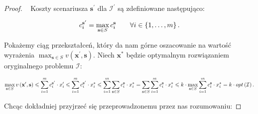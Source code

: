 \begin{proof}~\cite[$430$]{minmaxSurvey}
	Koszty scenariusza $\textbf{s}^{\prime}$ dla $\mathcal{I}^{\prime}$ są zdefiniowane następująco:
	
	\begin{equation}
		c^{\textbf{s}^{\prime}}_{i} = \max_{\mathclap{\textbf{s} \in S}} c^{\textbf{s}}_{i} \qquad \forall i \in \left\{ 1, \dots, m \right\}\text{.}
	\end{equation}
	
	Pokażemy ciąg przekształceń, który da nam górne oszacowanie na wartość wyrażenia $ \max_{\textbf{s} \in S} v \left( \textbf{x}^{\prime}, \textbf{s} \right)$. Niech $\textbf{x}^{\ast}$ będzie optymalnym rozwiązaniem oryginalnego problemu $\mathcal{I}$:
	
	\begin{equation}
		\max_{\mathclap{\textbf{s} \in S}} v \left( \textbf{x}^{\prime}, \textbf{s} \right) \leqslant \sum_{\mathclap{i = 1}}^{m} c_{i}^{\textbf{s}^{\prime}} \cdot x_{i}^{\prime} \leqslant \sum_{\mathclap{i = 1}}^{m} c_{i}^{\textbf{s}^{\prime}} \cdot x_{i}^{\ast} \leqslant \sum_{\mathclap{i = 1}}^{m} \sum_{\mathclap{\textbf{s} \in S}} c_{i}^{\textbf{s}} \cdot x_{i}^{\ast} =  \sum_{\mathclap{\textbf{s} \in S}} \sum_{\mathclap{i = 1}}^{m} c_{i}^{\textbf{s}} \cdot x_{i}^{\ast} \leqslant k \cdot \max_{\mathclap{\textbf{s} \in S}} \sum_{\mathclap{i = 1}}^{m} c_{i}^{\textbf{s}} \cdot x_{i}^{\ast} = k \cdot opt \left( \mathcal{I} \right)\text{.}
	\end{equation}
	
	Chcąc dokładniej przyjrzeć się przeprowadzonemu przez nas rozumowaniu:
	

\end{proof}
